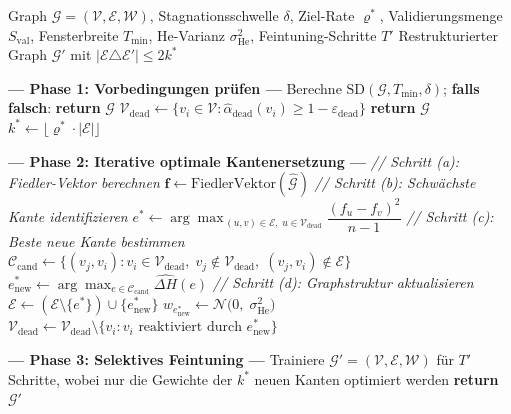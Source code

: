 ﻿\documentclass[12pt, a4paper, openany]{report}
\newcommand{\calG}{\mathcal{G}}
\newcommand{\calN}{\mathcal{N}}
\newcommand{\calV}{\mathcal{V}}
\newcommand{\calE}{\mathcal{E}}
\newcommand{\calW}{\mathcal{W}}
\newcommand{\calC}{\mathcal{C}}
\newcommand{\eps}{\varepsilon}
\begin{document}
\begin{algorithm}[H]
\caption{Optimale minimale Graphrestrukturierung (OMGR)}
\label{alg:omgr}
\begin{algorithmic}[1]
\Require Graph $\calG = (\calV, \calE, \calW)$, Stagnationsschwelle $\delta$,
         Ziel-Rate $\varrho^*$, Validierungsmenge $S_{\mathrm{val}}$,
         Fensterbreite $T_{\min}$, He-Varianz $\sigma^2_{\mathrm{He}}$,
         Feintuning-Schritte $T'$
\Ensure Restrukturierter Graph $\calG'$ mit
        $|\calE \triangle \calE'| \leq 2k^*$

\Statex \textbf{--- Phase 1: Vorbedingungen prüfen ---}
\State Berechne $\mathrm{SD}(\calG, T_{\min}, \delta)$;
       \textbf{falls falsch}: \textbf{return} $\calG$ 
\State $\calV_{\mathrm{dead}} \leftarrow
       \{v_i \in \calV : \hat{\alpha}_{\mathrm{dead}}(v_i) \geq 1 - \eps_{\mathrm{dead}}\}$
\If{$\calV_{\mathrm{dead}} = \emptyset$}
  \State \textbf{return} $\calG$
\EndIf
\State $k^* \leftarrow \lfloor \varrho^* \cdot |\calE| \rfloor$

\Statex \textbf{--- Phase 2: Iterative optimale Kantenersetzung ---}
  \State \textit{// Schritt (a): Fiedler-Vektor berechnen}
  \State $\bm{f} \leftarrow \mathrm{FiedlerVektor}(\hat{\calG})$
  \State \textit{// Schritt (b): Schwächste Kante identifizieren}
  \State $e^* \leftarrow \arg\max_{\,(u,v) \in \calE,\; u \in \calV_{\mathrm{dead}}}
         \dfrac{(f_u - f_v)^2}{n - 1}$
  \State \textit{// Schritt (c): Beste neue Kante bestimmen}
  \State $\calC_{\mathrm{cand}} \leftarrow
         \{(v_j, v_i) : v_i \in \calV_{\mathrm{dead}},\; v_j \notin \calV_{\mathrm{dead}},\;
           (v_j, v_i) \notin \calE\}$
  \State $e_{\mathrm{new}}^* \leftarrow \arg\max_{e \in \calC_{\mathrm{cand}}}
         \widehat{\Delta H}(e)$
  \State \textit{// Schritt (d): Graphstruktur aktualisieren}
  \State $\calE \leftarrow (\calE \setminus \{e^*\}) \cup \{e_{\mathrm{new}}^*\}$
  \State $w_{e_{\mathrm{new}}^*} \leftarrow \calN\!\bigl(0,\; \sigma^2_{\mathrm{He}}\bigr)$
  \State $\calV_{\mathrm{dead}} \leftarrow
         \calV_{\mathrm{dead}} \setminus \{v_i : v_i \text{ reaktiviert durch } e_{\mathrm{new}}^*\}$
\EndFor

\Statex \textbf{--- Phase 3: Selektives Feintuning ---}
\State Trainiere $\calG' = (\calV, \calE, \calW)$ für $T'$ Schritte,
       wobei nur die Gewichte der $k^*$ neuen Kanten optimiert werden
\State \textbf{return} $\calG'$
\end{algorithmic}
\end{algorithm}
\end{document}

